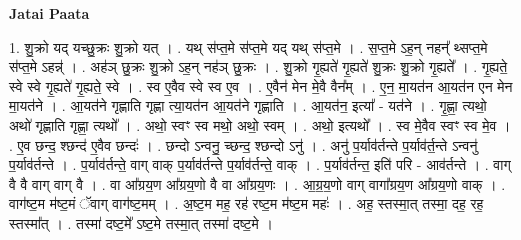 \documentclass[17pt]{extarticle}
\begin{document}
\textbf{Jatai Paata} \newline

1. शु॒क्रो यद् यच्छु॒क्रः शु॒क्रो यत् । . यथ् स॑प्त॒मे स॑प्त॒मे यद् यथ् स॑प्त॒मे । . स॒प्त॒मे ऽह॒न् नहन्᳚ थ्सप्त॒मे स॑प्त॒मे ऽहन्न्॑ । . अह॑ञ् छु॒क्रः शु॒क्रो ऽह॒न् नह॑ञ् छु॒क्रः । . शु॒क्रो गृ॒ह्यते॑ गृ॒ह्यते॑ शु॒क्रः शु॒क्रो गृ॒ह्यते᳚ । . गृ॒ह्यते॒ स्वे स्वे गृ॒ह्यते॑ गृ॒ह्यते॒ स्वे । . स्व ए॒वैव स्वे स्व ए॒व । . ए॒वैन॑ मेन मे॒वै वैन᳚म् । . ए॒न॒ मा॒यत॑न आ॒यत॑न एन मेन मा॒यत॑ने । . आ॒यत॑ने गृह्णाति गृह्णा त्या॒यत॑न आ॒यत॑ने गृह्णाति । . आ॒यत॑न॒ इत्या᳚ - यत॑ने । . गृ॒ह्णा॒ त्यथो॒ अथो॑ गृह्णाति गृह्णा॒ त्यथो᳚ । . अथो॒ स्वꣳ स्व मथो॒ अथो॒ स्वम् । . अथो॒ इत्यथो᳚ । . स्व मे॒वैव स्वꣳ स्व मे॒व । . ए॒व छन्द॒ श्छन्द॑ ए॒वैव छन्दः॑ । . छन्दो ऽन्वनु॒ च्छन्द॒ श्छन्दो ऽनु॑ । . अनु॑ प॒र्याव॑र्तन्ते प॒र्याव॑र्त॒न्ते ऽन्वनु॑ प॒र्याव॑र्तन्ते । . प॒र्याव॑र्तन्ते॒ वाग् वाक् प॒र्याव॑र्तन्ते प॒र्याव॑र्तन्ते॒ वाक् । . प॒र्याव॑र्तन्त॒ इति॑ परि - आव॑र्तन्ते । . वाग् वै वै वाग् वाग् वै । . वा आ᳚ग्रय॒ण आ᳚ग्रय॒णो वै वा आ᳚ग्रय॒णः । . आ॒ग्र॒य॒णो वाग् वागा᳚ग्रय॒ण आ᳚ग्रय॒णो वाक् । . वाग॑ष्ट॒म म॑ष्ट॒मं ॅवाग् वाग॑ष्ट॒मम् । . अ॒ष्ट॒म मह॒ रह॑ रष्ट॒म म॑ष्ट॒म महः॑ । . अह॒ स्तस्मा॒त् तस्मा॒ दह॒ रह॒ स्तस्मा᳚त् । . तस्मा॑ दष्ट॒मे᳚ ऽष्ट॒मे तस्मा॒त् तस्मा॑ दष्ट॒मे । \newline
\end{document}
